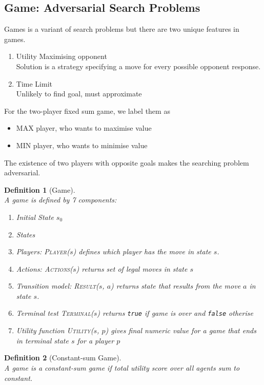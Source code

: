 \documentclass[12pt]{article}
\newtheorem{definition}{Definition}[section]
\theoremstyle{definition}
\begin{document}
\subsection{Game: Adversarial Search Problems}
Games is a variant of search problems but there are two unique features in games.
\begin{enumerate}
	\item Utility Maximising opponent\\
	Solution is a strategy specifying a move for every possible opponent response.
	\item Time Limit\\
	Unlikely to find goal, must approximate
\end{enumerate}
For the two-player fixed sum game, we label them as 
\begin{itemize}
	\item MAX player, who wants to maximise value
	\item MIN player, who wants to minimise value
\end{itemize}
The existence of two players with opposite goals makes the searching problem adversarial.
\begin{definition}[Game]
\hfill\\\normalfont A game is defined by 7 components:
\begin{enumerate}
	\item Initial State $s_0$
	\item States
	\item Players: \textsc{Player}($s$) defines which player has the move in state $s$.
	\item Actions: \textsc{Actions}($s$) returns set of legal moves in state $s$
	\item Transition model: \textsc{Result}($s$, $a$) returns state that results from the move $a$ in state $s$.
	\item Terminal test \textsc{Terminal}($s$) returns \texttt{true} if game is over and \texttt{false} otherise
	\item Utility function \textsc{Utility}($s$, $p$) gives final numeric value for a game that ends in terminal state $s$ for a player $p$
\end{enumerate}
\end{definition}
\begin{definition}[Constant-sum Game]
\hfill\\\normalfont A game is a constant-sum game if total utility score over all agents sum to constant.
\end{definition} 
\end{document}
